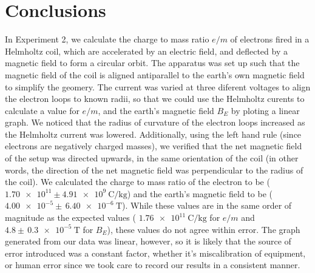 \documentclass[letterpaper]{article}
\begin{document}
\section{Conclusions}
In Experiment 2, we calculate the charge to mass ratio $e/m$ of electrons fired in a Helmholtz coil, which are accelerated by an electric field, and
deflected by a magnetic field to form a circular orbit. The apparatus
was set up such that the magnetic field of the coil is aligned antiparallel to the earth's own magnetic field
to simplify the geomery. The current was varied at three diferent voltages to align the electron loops to known radii, so that we could use the
Helmholtz curents to calculate a value for $e/m$, and the earth's magnetic field $B_E$ by ploting a linear graph. We noticed that the
radius of curvature of the electron loops increased as the Helmholtz current was lowered. Additionally, using the
left hand rule (since electrons are negatively charged masses), we verified that the net magnetic field of the
setup was directed upwards, in the same orientation of the coil (in other words, the direction of the net magnetic field
was perpendicular to the radius of the coil). We calculated the charge to mass ratio of the electron to be ($\num{1.70e11} \pm \SI{4.91e9}{\coulomb\per\kilogram}$)
and the earth's magnetic field to be
($\num{4.00e-5} \pm \,\SI{6.40e-6}{\tesla}$). While these values are in the same order of magnitude as the
expected values ( $\SI{1.76e11}{\coulomb\per\kilogram}$ for $e/m$
and $4.8 \pm \,\SI{0.3e-5}{\tesla}$ for $B_E$), these values do not agree within error. The
graph generated from our data was linear, however, so it is likely that the source of error introduced was a
constant factor, whether it's miscalibration of equipment, or human error since we took care to record our
results in a consistent manner.
\end{document}
